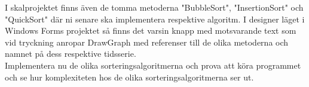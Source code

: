 \documentclass{article}
\begin{document}
I skalprojektet finns även de tomma metoderna "BubbleSort", "InsertionSort" och "QuickSort" där ni senare ska implementera respektive algoritm. I designer läget i Windows Forms projektet så finns det varsin knapp med motsvarande text som vid tryckning anropar DrawGraph med referenser till de olika metoderna och namnet på dess respektive tidsserie.\\

Implementera nu de olika sorteringsalgoritmerna och prova att köra programmet och se hur komplexiteten hos de olika sorteringsalgoritmerna ser ut.\\



\end{document}
